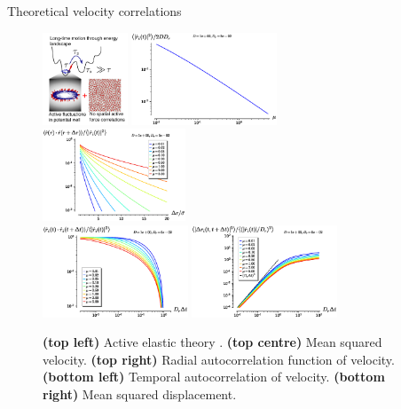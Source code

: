 \documentclass{beamer}
\begin{document}
\begin{frame}{Theoretical velocity correlations}

\begin{figure}
\centering
\includegraphics[height=2.75cm]{henkes2020_fig1a.png}
\includegraphics[height=2.75cm]{henkes_natcomm_2020_eq11.eps}
\includegraphics[height=2.75cm]{henkes_natcomm_2020_eq62.eps}\\
\includegraphics[height=2.75cm]{henkes_natcomm_2020_eq57.eps}
\includegraphics[height=2.75cm]{henkes_natcomm_2020_eq57_msd.eps}
\caption{{\bf (top left)} Active elastic theory . {\bf (top centre)} Mean squared velocity. {\bf (top right)} Radial autocorrelation function of velocity. {\bf (bottom left)} Temporal autocorrelation of velocity. {\bf (bottom right)} Mean squared displacement.}
\end{figure}

\vspace{-10pt}

\end{frame}
\end{document}
